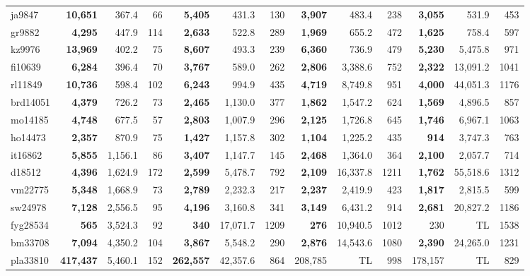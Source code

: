\documentclass[ijoo,nonblindrev]{informs-ijoo}
\begin{document}
\begin{table}[!hbtp]
{\begin{tabular}{|l|rrr|rrr|rrr|rrr|}
			ja9847 & \textbf{10,651} & 367.4 & 66 & \textbf{5,405} & 431.3 & 130 & \textbf{3,907} & 483.4 & 238 & \textbf{3,055} & 531.9 & 453\\
			gr9882 & \textbf{4,295} & 447.9 & 114 & \textbf{2,633} & 522.8 & 289 & \textbf{1,969} & 655.2 & 472 & \textbf{1,625} & 758.4 & 597\\
			kz9976 & \textbf{13,969} & 402.2 & 75 & \textbf{8,607} & 493.3 & 239 & \textbf{6,360} & 736.9 & 479 & \textbf{5,230} & 5,475.8 & 971\\
			fi10639 & \textbf{6,284} & 396.4 & 70 & \textbf{3,767} & 589.0 & 262 & \textbf{2,806} & 3,388.6 & 752 & \textbf{2,322} & 13,091.2 & 1041\\
			rl11849 & \textbf{10,736} & 598.4 & 102 & \textbf{6,243} & 994.9 & 435 & \textbf{4,719} & 8,749.8 & 951 & \textbf{4,000} & 44,051.3 & 1176\\
			brd14051 & \textbf{4,379} & 726.2 & 73 & \textbf{2,465} & 1,130.0 & 377 & \textbf{1,862} & 1,547.2 & 624 & \textbf{1,569} & 4,896.5 & 857\\
			mo14185 & \textbf{4,748} & 677.5 & 57 & \textbf{2,803} & 1,007.9 & 296 & \textbf{2,125} & 1,726.8 & 645 & \textbf{1,746} & 6,967.1 & 1063\\
			ho14473 & \textbf{2,357} & 870.9 & 75 & \textbf{1,427} & 1,157.8 & 302 & \textbf{1,104} & 1,225.2 & 435 & \textbf{914} & 3,747.3 & 763\\
			it16862 & \textbf{5,855} & 1,156.1 & 86 & \textbf{3,407} & 1,147.7 & 145 & \textbf{2,468} & 1,364.0 & 364 & \textbf{2,100} & 2,057.7 & 714\\
			d18512 & \textbf{4,396} & 1,624.9 & 172 & \textbf{2,599} & 5,478.7 & 792 & \textbf{2,109} & 16,337.8 & 1211 & \textbf{1,762} & 55,518.6 & 1312\\
			vm22775 & \textbf{5,348} & 1,668.9 & 73 & \textbf{2,789} & 2,232.3 & 217 & \textbf{2,237} & 2,419.9 & 423 & \textbf{1,817} & 2,815.5 & 599\\
			sw24978 & \textbf{7,128} & 2,556.5 & 95 & \textbf{4,196} & 3,160.8 & 341 & \textbf{3,149} & 6,431.2 & 914 & \textbf{2,681} & 20,827.2 & 1186\\
			fyg28534 & \textbf{565} & 3,524.3 & 92 & \textbf{340} & 17,071.7 & 1209 & \textbf{276} & 10,940.5 & 1012 & 230 & TL & 1538\\
			bm33708 & \textbf{7,094} & 4,350.2 & 104 & \textbf{3,867} & 5,548.2 & 290 & \textbf{2,876} & 14,543.6 & 1080 & \textbf{2,390} & 24,265.0 & 1231\\
			pla33810 & \textbf{417,437} & 5,460.1 & 152 & \textbf{262,557} & 42,357.6 & 864 & 208,785 & TL & 998 & 178,157 & TL & 829\\

\end{tabular}}
\end{table}
\end{document}
